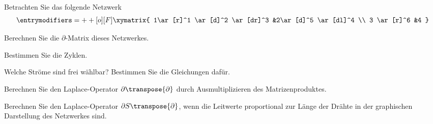 Betrachten Sie das folgende Netzwerk
\[
\entrymodifiers={++[o][F]}
\xymatrix{
1\ar[r]^1 \ar[d]^2 \ar[dr]^3
	&2\ar[d]^5 \ar[dl]^4
\\
3 \ar[r]^6
	&4
}
\]
\begin{teilaufgaben}
\item Berechnen Sie die $\partial$-Matrix dieses Netzwerkes.
\item Bestimmen Sie die Zyklen.
\item Welche Ströme sind frei wählbar? Bestimmen Sie die Gleichungen dafür.
\item Berechnen Sie den Laplace-Operator $\partial\transpose{\partial}$ 
durch Ausmultiplizieren des Matrizenproduktes.
\item Berechnen Sie den Laplace-Operator $\partial S\transpose{\partial}$, wenn
die Leitwerte proportional zur Länge der Drähte in der graphischen
Darstellung des Netzwerkes sind.
\end{teilaufgaben}


